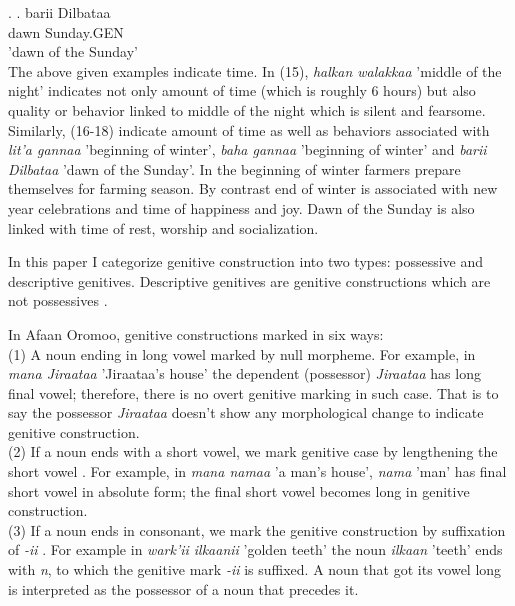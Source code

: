 \documentclass[11pt,a4paper]{article}
\begin{document}
	\ex.
	\ag.
	barii Dilbataa\\
	dawn Sunday.GEN\\
	'dawn of the Sunday'\\
	
	The above given examples indicate time. In (15), \emph{halkan walakkaa} 'middle of the night' indicates not only amount of time (which is roughly 6 hours) but also quality or behavior linked to middle of the night which is silent and fearsome. Similarly, (16-18) indicate amount of time as well as behaviors associated with \emph{lit'a gannaa} 'beginning of winter', \emph{baha gannaa} 'beginning of winter' and \emph{barii Dilbataa} 'dawn of the Sunday'. In the beginning of winter farmers prepare themselves for farming season. By contrast end of winter is associated with new year celebrations and time of happiness and joy. Dawn of the Sunday is also linked with time of rest, worship and socialization. 
	
	
	In this paper I categorize genitive construction into two types: possessive and descriptive genitives. Descriptive genitives are genitive constructions which are not possessives \cite{rosenbach2006descriptive}.
	
	In Afaan Oromoo, genitive constructions marked in six ways:\\
	
	(1) A noun ending in long vowel marked by null morpheme. For example,  in \emph{mana Jiraataa} 'Jiraataa's house' the dependent (possessor) \emph{Jiraataa} has long final vowel; therefore, there is no overt genitive marking in such case. That is to say the possessor \emph{Jiraataa} doesn't show any morphological change to indicate genitive construction. \\
	
	(2) If a noun ends with a short vowel, we mark genitive case by lengthening the short vowel \cite[183]{gragg1976oromo,gobena2019verb}. For example, in \emph{mana namaa} 'a man's house', \emph{nama} 'man' has final short vowel in absolute form; the final short vowel becomes long in genitive construction. \\
	
	(3) If a noun ends in consonant, we mark the genitive construction by suffixation of \emph{-ii} \cite{gobena2019verb}. For example in \emph{wark'ii ilkaanii} 'golden teeth' the noun \emph{ilkaan} 'teeth' ends with \emph{n}, to which the genitive mark \emph{-ii} is suffixed. A noun that got its vowel long is interpreted as the possessor of a noun that precedes it. \\
	
\end{document}
